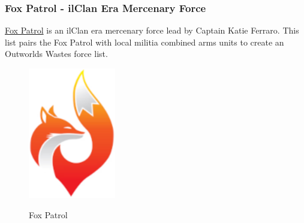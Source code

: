 \subsubsection{Fox Patrol - ilClan Era Mercenary Force}

\href{https://www.sarna.net/wiki/Fox_Patrol}{Fox Patrol} is an ilClan era mercenary force lead by Captain Katie Ferraro.
This list pairs the Fox Patrol with local militia combined arms units to create an Outworlds Wastes force list.

\begin{figure}[!h]
  \centering
  \includegraphics[alt='Fox Patrol Logo', width=1.5in, height=2.25in]{img/Fox-Patrol.png}
  \caption*{Fox Patrol}
\end{figure}

